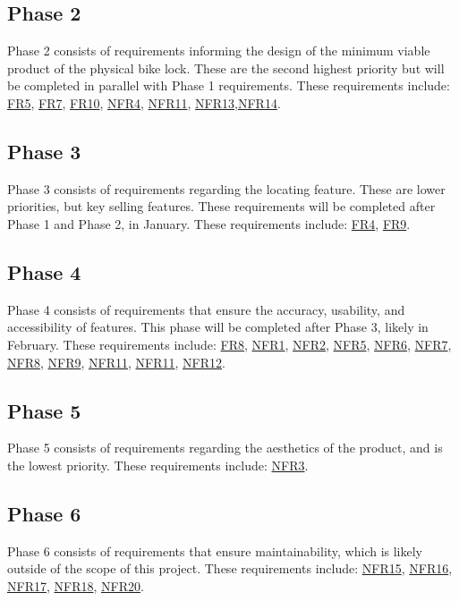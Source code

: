\documentclass[12pt]{article}
\begin{document}
\subsection{Phase 2}
Phase 2 consists of requirements informing the design of the minimum viable product of the physical bike lock. These are the second highest priority but will be completed in parallel with Phase 1 requirements. These requirements include:
\hyperref[FRSturdy]{FR5}, \hyperref[FRBikeFrame]{FR7}, \hyperref[FRPower]{FR10}, \hyperref[NFRFunc]{NFR4}, \hyperref[NFRBatteryLife]{NFR11}, \hyperref[NFRTools]{NFR13},\hyperref[NFRModels]{NFR14}.

\subsection{Phase 3}
Phase 3 consists of requirements regarding the locating feature. These are lower priorities, but key selling features. These requirements will be completed after Phase 1 and Phase 2, in January. These requirements include:
\hyperref[FRUserPos]{FR4}, \hyperref[FRLocDisplay]{FR9}.

\subsection{Phase 4}
Phase 4 consists of requirements that ensure the accuracy, usability, and accessibility of features. This phase will be completed after Phase 3, likely in February. These requirements include:
\hyperref[FRBatteryLevelDisplay]{FR8}, \hyperref[NFRInst]{NFR1}, \hyperref[NFRStor]{NFR2},  \hyperref[NFRHarm]{NFR5}, \hyperref[NFRAccuracyStatus]{NFR6}, \hyperref[NFRAccuracyPos]{NFR7}, \hyperref[NFRBatteryLevel]{NFR8}, \hyperref[NFRCompQuick]{NFR9}, \hyperref[NFRBatteryLife]{NFR11}, \hyperref[NFRBatteryLife]{NFR11}, \hyperref[NFRBatteryAccess]{NFR12}.

\subsection{Phase 5}
Phase 5 consists of requirements regarding the aesthetics of the product, and is the lowest priority. These requirements include: \hyperref[NFRVisual]{NFR3}.

\subsection{Phase 6}
Phase 6 consists of requirements that ensure maintainability, which is likely outside of the scope of this project. These requirements include: \hyperref[NFRGUI]{NFR15}, \hyperref[NFRController]{NFR16}, \hyperref[NFRCircuit]{NFR17}, \hyperref[NFRMech]{NFR18}, \hyperref[NFRUpdates]{NFR20}.
\end{document}
